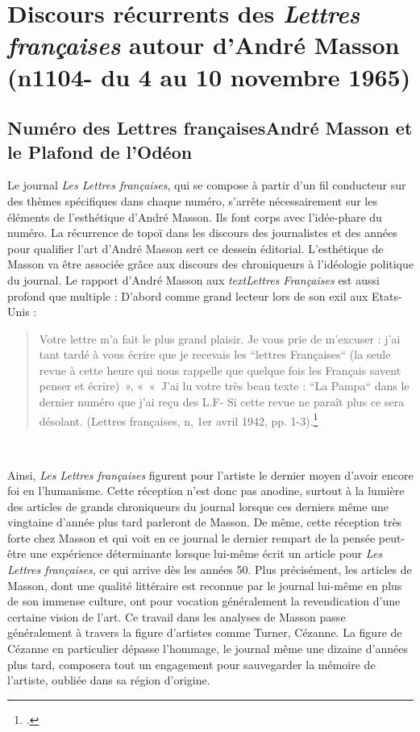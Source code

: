 \section{Discours récurrents des \emph{Lettres françaises} autour d’André Masson (n1104- du 4 au 10 novembre 1965)}  

\subsection{Numéro des Lettres françaisesAndré Masson et le Plafond de l'Odéon }



Le journal \emph{Les Lettres françaises}, qui se compose à partir d’un fil conducteur sur des thèmes spécifiques dans chaque numéro, s’arrête nécessairement sur les éléments de l’esthétique d’André Masson.  Ils font corps avec l’idée-phare du numéro.  La récurrence de topoï dans les discours des journalistes et des années pour qualifier l’art d’André Masson sert ce dessein éditorial. L’esthétique de Masson va être associée grâce aux discours des chroniqueurs à l’idéologie politique du journal. Le rapport d’André Masson aux \emph{textLettres Françaises} est aussi profond que multiple : D’abord comme grand lecteur lors de son exil aux Etats-Unis : 

\begin{quote}
Votre lettre m’a fait le plus grand plaisir. Je vous prie de m’excuser : j’ai tant tardé à vous écrire que je recevais les “lettres Françaises“ (la seule revue à cette heure qui nous rappelle que quelque fois les Français savent penser et écrire) », « « J’ai lu votre très beau texte : “La Pampa“ dans le dernier numéro que j’ai reçu des L.F- Si cette revue ne paraît plus ce sera désolant. (Lettres françaises, n, 1er avril 1942, pp. 1-3).\footcite[p478]{anneessurrealistes}
\end{quote}
 

	Ainsi, \emph{Les Lettres françaises }figurent pour l’artiste le dernier moyen d’avoir encore foi en l’humanisme. Cette réception n’est donc pas anodine, surtout à la lumière des articles de grands chroniqueurs du journal lorsque ces derniers même une vingtaine d’année plus tard parleront de Masson. De même, cette réception très forte chez Masson et qui voit en ce journal le dernier rempart de la pensée peut-être une expérience déterminante lorsque lui-même écrit un article pour \emph{Les Lettres françaises}, ce qui arrive dès les années 50. Plus précisément, les articles de Masson, dont une qualité littéraire est reconnue par le journal lui-même en plus de son immense culture, ont pour vocation généralement la revendication d’une certaine vision de l’art. Ce travail dans les analyses de Masson passe généralement à travers la figure d’artistes comme Turner, Cézanne. La figure de Cézanne en particulier dépasse l’hommage, le journal même une dizaine d’années plus tard, composera tout un engagement pour sauvegarder la mémoire de l’artiste, oubliée dans sa région d’origine. 

